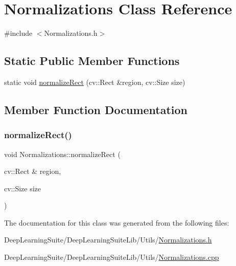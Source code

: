 \hypertarget{class_normalizations}{}\section{Normalizations Class Reference}
\label{class_normalizations}


{\ttfamily \#include $<$Normalizations.\+h$>$}

\subsection*{Static Public Member Functions}
\begin{DoxyCompactItemize}
\item 
static void \hyperlink{class_normalizations_aa96f186b39b47d20b98da5cdb22217f2}{normalize\+Rect} (cv\+::\+Rect \&region, cv\+::\+Size size)
\end{DoxyCompactItemize}


\subsection{Member Function Documentation}
\mbox{\label{class_normalizations_aa96f186b39b47d20b98da5cdb22217f2}} 
\subsubsection{\texorpdfstring{normalize\+Rect()}{normalizeRect()}}
{\footnotesize\ttfamily void Normalizations\+::normalize\+Rect (\begin{DoxyParamCaption}\item[{cv\+::\+Rect \&}]{region,  }\item[{cv\+::\+Size}]{size }\end{DoxyParamCaption})\hspace{0.3cm}{\ttfamily [static]}}



The documentation for this class was generated from the following files\+:\begin{DoxyCompactItemize}
\item 
Deep\+Learning\+Suite/\+Deep\+Learning\+Suite\+Lib/\+Utils/\hyperlink{_normalizations_8h}{Normalizations.\+h}\item 
Deep\+Learning\+Suite/\+Deep\+Learning\+Suite\+Lib/\+Utils/\hyperlink{_normalizations_8cpp}{Normalizations.\+cpp}\end{DoxyCompactItemize}
